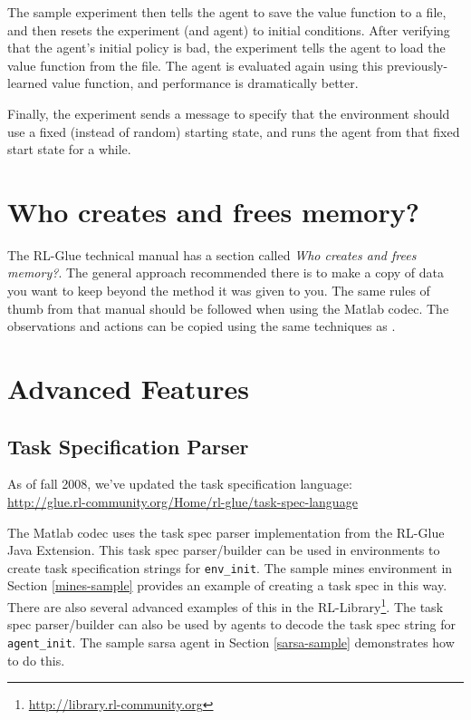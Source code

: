 \documentclass[11pt]{article}
\begin{document}
The sample experiment then tells the agent to save the value function to a file, and then resets the experiment (and agent) to initial conditions.  After verifying that the agent's initial policy is bad, the experiment tells the agent to load the value function from the file.  The agent is evaluated again using this previously-learned value function, and performance is dramatically better.

Finally, the experiment sends a message to specify that the environment should use a fixed (instead of random) starting state, and runs the agent from that fixed start state for a while.

\section{Who creates and frees memory?}
The RL-Glue technical manual has a section called \textit{Who creates and frees memory?}.  The general approach recommended there is to make a copy of data you want to keep beyond the method it was given to you.  The same rules of thumb from that manual should be followed when using the Matlab codec.  The observations and actions can be copied using the same techniques as .


\section{Advanced Features}
\subsection{Task Specification Parser}
As of fall 2008, we've updated the task specification language:\\
\url{http://glue.rl-community.org/Home/rl-glue/task-spec-language}

The Matlab codec uses the task spec parser implementation from the RL-Glue Java Extension.  This task spec parser/builder can be used in environments to create task specification strings for \texttt{env\_init}.  The sample mines environment in Section \ref{mines-sample} provides an example of creating a task spec in this way.  There are also several advanced examples of this in the RL-Library\footnote{\url{http://library.rl-community.org}}.  The task spec parser/builder can also be used by agents to decode the task spec string for \texttt{agent\_init}.  The sample sarsa agent in Section \ref{sarsa-sample} demonstrates how to do this.
\end{document}
